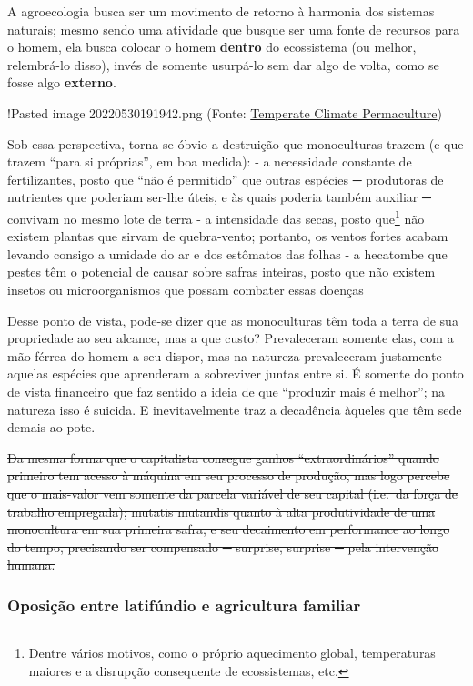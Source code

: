 A agroecologia busca ser um movimento de retorno à harmonia dos sistemas
naturais; mesmo sendo uma atividade que busque ser uma fonte de recursos
para o homem, ela busca colocar o homem \textbf{dentro} do ecossistema
(ou melhor, relembrá-lo disso), invés de somente usurpá-lo sem dar algo
de volta, como se fosse algo \textbf{externo}.

!Pasted image 20220530191942.png (Fonte:
\href{https://tcpermaculture.com/site/2013/05/27/nine-layers-of-the-edible-forest-garden/\#prettyPhoto}{Temperate
Climate Permaculture})

Sob essa perspectiva, torna-se óbvio a destruição que monoculturas
trazem (e que trazem ``para si próprias'', em boa medida): - a
necessidade constante de fertilizantes, posto que ``não é permitido''
que outras espécies ─ produtoras de nutrientes que poderiam ser-lhe
úteis, e às quais poderia também auxiliar ─ convivam no mesmo lote de
terra - a intensidade das secas, posto que\footnote{Dentre vários
  motivos, como o próprio aquecimento global, temperaturas maiores e a
  disrupção consequente de ecossistemas, etc.} não existem plantas que
sirvam de quebra-vento; portanto, os ventos fortes acabam levando
consigo a umidade do ar e dos estômatos das folhas - a hecatombe que
pestes têm o potencial de causar sobre safras inteiras, posto que não
existem insetos ou microorganismos que possam combater essas doenças

Desse ponto de vista, pode-se dizer que as monoculturas têm toda a terra
de sua propriedade ao seu alcance, mas a que custo? Prevaleceram somente
elas, com a mão férrea do homem a seu dispor, mas na natureza
prevaleceram justamente aquelas espécies que aprenderam a sobreviver
juntas entre si. É somente do ponto de vista financeiro que faz sentido
a ideia de que ``produzir mais é melhor''; na natureza isso é suicida. E
inevitavelmente traz a decadência àqueles que têm sede demais ao pote.

\st{Da mesma forma que o capitalista consegue ganhos ``extraordinários''
quando primeiro tem acesso à máquina em seu processo de produção, mas
logo percebe que o mais-valor vem somente da parcela variável de seu
capital (i.e.~da força de trabalho empregada); mutatis mutandis quanto à
alta produtividade de uma monocultura em sua primeira safra, e seu
decaimento em performance ao longo do tempo, precisando ser compensado ─
surprise, surprise ─ pela intervenção humana.}

\hypertarget{oposiuxe7uxe3o-entre-latifuxfandio-e-agricultura-familiar}{%
\subsubsection{Oposição entre latifúndio e agricultura
familiar}\label{oposiuxe7uxe3o-entre-latifuxfandio-e-agricultura-familiar}}


